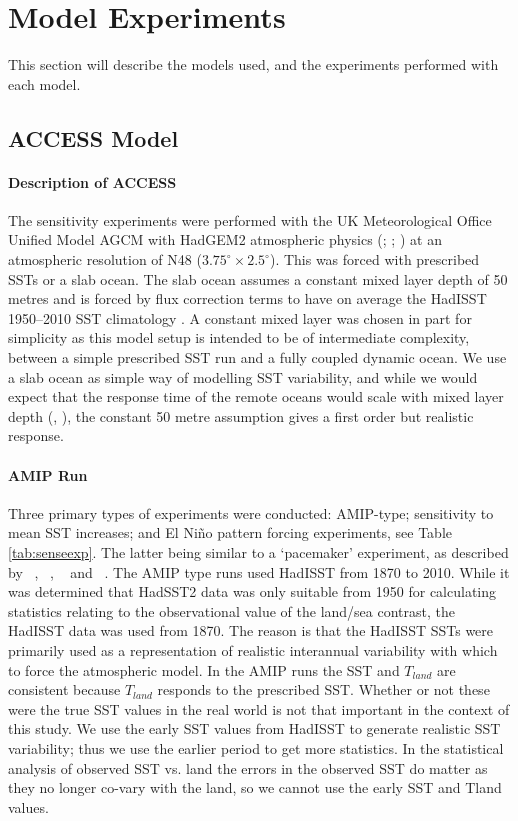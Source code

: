 \section{Model Experiments}

This section will describe the models used, and the experiments performed with 
each model.


\subsection{ACCESS Model}

\paragraph{Description of ACCESS}
The sensitivity experiments were performed with the UK Meteorological Office 
Unified Model AGCM with HadGEM2 atmospheric physics (\citet{Davies2005}; 
\citet{Martin2010}; \citet{Bellouin2011}) at an atmospheric resolution of N48 
($3.75^{\circ} \times 
2.5^{\circ}$). This was forced with prescribed SSTs or a slab ocean. The slab
ocean assumes a constant mixed layer depth of 50 metres and is forced by flux 
correction terms to have on average the HadISST 1950--2010 SST climatology 
\citep{Wang2014}. A constant mixed layer was chosen in part for simplicity as 
this model setup is intended to be of intermediate complexity, between a simple 
prescribed SST run and a fully coupled dynamic ocean. We use a slab ocean as 
simple way of modelling SST variability, and while we would expect that the 
response time of the remote oceans would scale with mixed layer depth 
(\citealt{Su2005a}, \citealt{Lintner2007}), the constant 
50 metre assumption gives a first order but realistic response.

\paragraph{AMIP Run}
Three primary types of experiments were conducted: AMIP-type; sensitivity to 
mean SST increases; and El Ni{\~n}o pattern forcing experiments, see Table 
\ref{tab:senseexp}. The latter being similar to a `pacemaker' experiment, as 
described by ~\citealt{Alexander1992}, ~\citealt{Alexander1992a}, 
~\citealt{Lau2000} and ~\citealt{Lu2011}. The AMIP type runs used HadISST from 
1870 to 2010. While it was determined that HadSST2 data was only suitable
from 1950 for calculating statistics relating to the observational value of the 
land/sea contrast, the HadISST data was used from 1870. The reason is that the 
HadISST SSTs were primarily used as a representation of realistic interannual 
variability with which to force the atmospheric model.  In the AMIP runs the SST 
and $T_{land}$ are consistent because $T_{land}$ responds to the prescribed SST.  
Whether or not these were the true SST values in the real world is not that 
important in the context of this study.  We use the early SST values from 
HadISST to generate realistic SST variability; thus we use the earlier period to 
get more statistics. In the statistical analysis of observed SST vs. land the 
errors in the observed SST do matter as they no longer co-vary with the land, so 
we cannot use the early SST and Tland values. 

